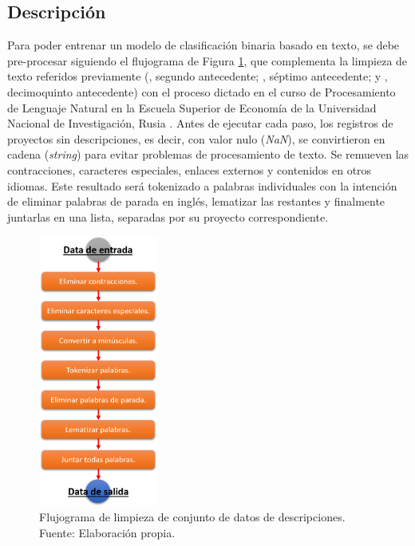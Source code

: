 \subsection{Descripción}
Para poder entrenar un modelo de clasificación binaria basado en texto, se debe pre-procesar siguiendo el flujograma de Figura \ref{4:fig32}, que complementa la limpieza de texto referidos previamente (\citeauthor{pr_mitra2014phrases}, segundo antecedente; \citeauthor{pr_yuan2016textanalytics}, séptimo antecedente; y \citeauthor{pr_chen2019keywords_crowdfunding}, decimoquinto antecedente) con el proceso dictado en el curso de Procesamiento de Lenguaje Natural en la Escuela Superior de Economía de la Universidad Nacional de Investigación, Rusia \parencite{tec_zimovnov2018text_preprocessing}. Antes de ejecutar cada paso, los registros de proyectos sin descripciones, es decir, con valor nulo (\textit{NaN}), se convirtieron en cadena (\textit{string}) para evitar problemas de procesamiento de texto. Se remueven las contracciones, caracteres especiales, enlaces externos y contenidos en otros idiomas. Este resultado será tokenizado a palabras individuales con la intención de eliminar palabras de parada en inglés, lematizar las restantes y finalmente juntarlas en una lista, separadas por su proyecto correspondiente.

\begin{figure}[!ht]
	\begin{center}
		\includegraphics[width=0.35\textwidth]{4/figures/description_data_clean.png}
		\caption{Flujograma de limpieza de conjunto de datos de descripciones. Fuente: Elaboración propia.}
		\label{4:fig32}
	\end{center}
\end{figure}

